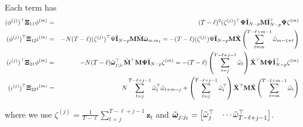 		Each term has 
		\begin{eqnarray*}
			(\phi^{(j)})^\top \bm{\Xi}_{11} \phi^{(m)} &=& (T - \ell)^2 (\zeta^{(j)})^\top \bm{\Psi} \tilde{\mathbf{I}}_{N-p} \mathbf{M} \tilde{\mathbf{I}}_{N-p}^\top \bm{\Psi} \zeta^{(m)} \\
			(\phi^{(j)})^\top \bm{\Xi}_{12} \iota^{(m)} &=& - N (T - \ell) (\zeta^{(j)})^\top\Psi \tilde{\mathbf{I}}_{N-p} \mathbf{M} \tilde{\mathbf{M}} \tilde{\bm{\omega}}_{m:m_\ell} = -(T - \ell)  (\zeta^{(j)})\Psi \tilde{\mathbf{I}}_{N-p} \mathbf{M} \tilde{\mathbf{X}} \left( \sum_{t=m}^{T - \ell+m-1} \tilde{{\omega} }_{m-1+t} \right)  \\
			(\iota^{(j)})^\top \bm{\Xi}_{21} \phi^{(m)} &=& -N (T - \ell) \tilde{\bm{\omega}}_{j:j_\ell}^\top \tilde{\mathbf{M}}^\top \mathbf{M} \bm{\Psi} \tilde{\mathbf{I}}_{N-p} \zeta^{(m)} = - (T - \ell) \left( \sum_{t=j}^{T - \ell+j-1} \tilde \omega_t \right)  \tilde{\mathbf{X}}^\top \mathbf{M} \bm{\Psi} \tilde{\mathbf{I}}_{N-p}^\top \zeta^{(m)} \\
			(\iota^{(j)})^\top \bm{\Xi}_{22} \iota^{(m)} &=& N \sum_{t=j}^{T - \ell+j-1} \tilde \omega_{t}^\top \tilde \omega_{t+m-j}  + \left( \sum_{t=j}^{T - \ell+j-1} \tilde \omega_t^\top \right)  \tilde{\mathbf{X}}^\top \mathbf{M} \tilde{\mathbf{X}}  \left( \sum_{t=m}^{T - \ell+m-1} \tilde \omega_t \right)
		\end{eqnarray*}
		
		where we use  $\zeta^{(j)} = \frac{1}{T - \ell} \sum_{t=j}^{T - \ell+j-1} \bm{z}_t$ and $\tilde{\bm{\omega}}_{j:j_\ell} = \begin{bmatrix}
		\tilde \omega_j^\top & \cdots \tilde \omega_{T - \ell+j-1}^\top
		\end{bmatrix} $.
		
